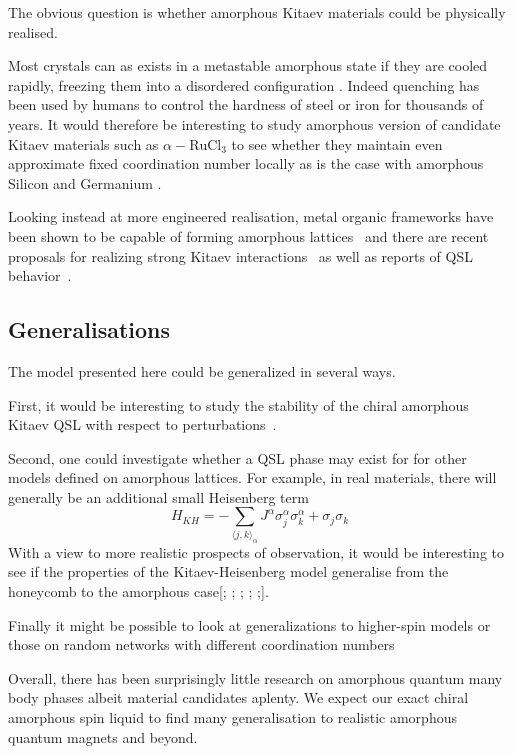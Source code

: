 The obvious question is whether amorphous Kitaev materials could be physically realised.

Most crystals can as exists in a metastable amorphous state if they are cooled rapidly, freezing them into a disordered configuration \autocite{Weaire1976,Petrakovski1981,Kaneyoshi2018}. Indeed quenching has been used by humans to control the hardness of steel or iron for thousands of years. It would therefore be interesting to study amorphous version of candidate Kitaev materials \textcite{trebstKitaevMaterials2022} such as \(\alpha-\textrm{RuCl}_3\) to see whether they maintain even approximate fixed coordination number locally as is the case with amorphous Silicon and Germanium \autocite{Weaire1971,betteridge1973possible}.

Looking instead at more engineered realisation, metal organic frameworks have been shown to be capable of forming amorphous lattices~\autocite{bennett2014amorphous} and there are recent proposals for realizing strong Kitaev interactions~\autocite{yamada2017designing} as well as reports of QSL behavior~\autocite{misumi2020quantum}.

\hypertarget{generalisations}{%
\subsection{Generalisations}\label{generalisations}}

The model presented here could be generalized in several ways.

First, it would be interesting to study the stability of the chiral amorphous Kitaev QSL with respect to perturbations~\autocite{Rau2014,Chaloupka2010,Chaloupka2013,Chaloupka2015,Winter2016}.

Second, one could investigate whether a QSL phase may exist for for other models defined on amorphous lattices. For example, in real materials, there will generally be an additional small Heisenberg term \[H_{KH} =  - \sum_{\langle j,k\rangle_\alpha} J^{\alpha}\sigma_j^{\alpha}\sigma_k^{\alpha} + \sigma_j\sigma_k\] With a view to more realistic prospects of observation, it would be interesting to see if the properties of the Kitaev-Heisenberg model generalise from the honeycomb to the amorphous case{[}\textcite{Chaloupka2010}; \textcite{Chaloupka2015}; \textcite{Jackeli2009}; \textcite{Kalmeyer1989}; \textcite{manousakisSpinTextonehalfHeisenberg1991};{]}.

Finally it might be possible to look at generalizations to higher-spin models or those on random networks with different coordination numbers \autocite{Baskaran2008,Yao2009,Nussinov2009,Yao2011,Chua2011,Natori2020,Chulliparambil2020,Chulliparambil2021,Seifert2020,WangHaoranPRB2021,Wu2009}

Overall, there has been surprisingly little research on amorphous quantum many body phases albeit material candidates aplenty. We expect our exact chiral amorphous spin liquid to find many generalisation to realistic amorphous quantum magnets and beyond.
